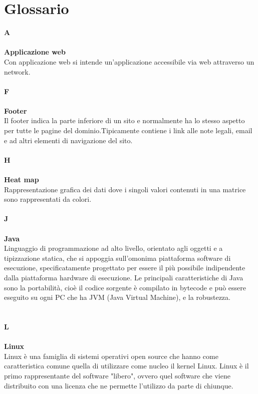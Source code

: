 \chapter{Glossario} \label{Glossario}
\textbf{A} \\
\\
\textbf{Applicazione web} \\
Con applicazione web si intende un'applicazione accessibile via web attraverso un network. \\
\\
\textbf{F} \\
\\
\textbf{Footer} \\
Il footer indica la parte inferiore di un sito e normalmente ha lo stesso aspetto per tutte le pagine del dominio.Tipicamente contiene i link alle note legali, email  e ad altri elementi di navigazione del sito. \\
\\
\textbf{H} \\
\\
\textbf{Heat map} \\
 Rappresentazione grafica dei dati dove i singoli valori contenuti in una matrice sono rappresentati da colori. \\
\\
\textbf{J} \\
\\
\textbf{Java} \\
Linguaggio di programmazione ad alto livello, orientato agli oggetti e a tipizzazione statica, che si appoggia sull'omonima piattaforma software di esecuzione, specificatamente progettato per essere il più possibile indipendente dalla piattaforma hardware di esecuzione. Le principali caratteristiche di Java sono la portabilità, cioè il codice sorgente
è compilato in bytecode e può essere eseguito su ogni PC che ha JVM (Java Virtual Machine), e la robustezza. \\
\\
\\
\textbf{L} \\
\\
\textbf{Linux} \\
Linux è una famiglia di sistemi operativi open source che hanno come caratteristica comune quella di utilizzare come nucleo il kernel Linux. Linux è il primo rappresentante del software "libero", ovvero quel software che viene distribuito con una licenza che ne permette l'utilizzo da parte di chiunque. \\
\\
